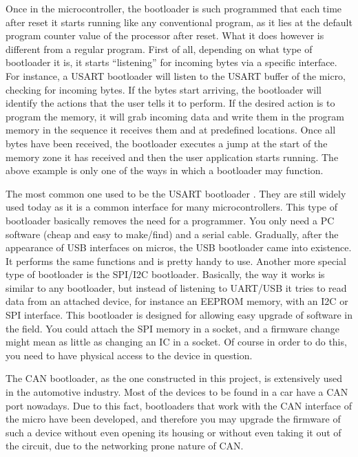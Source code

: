 \documentclass[11pt]{article} %
\begin{document}
Once in the microcontroller, the bootloader is such programmed that each time after reset it starts running like any conventional program, as it lies at the default program counter value of the processor after reset. What it does however is different from a regular program. First of all, depending on what type of bootloader it is, it starts “listening” for incoming bytes via a specific interface. For instance, a USART bootloader will listen to the USART buffer of the micro, checking for incoming bytes. If the bytes start arriving, the bootloader will identify the actions that the user tells it to perform. If the desired action is to program the memory, it will grab incoming data and write them in the program memory in the sequence it receives them and at predefined locations. Once all bytes have been received, the bootloader executes a jump at the start of the memory zone it has received and then the user application starts running. The above example is only one of the ways in which a bootloader may function. 

The most common one used to be the USART bootloader \cite{ref:bootloadertheory}. They are still widely used today as it is a common interface for many microcontrollers. This type of bootloader basically removes the need for a programmer. You only need a PC software (cheap and easy to make/find) and a serial cable. Gradually, after the appearance of USB interfaces on micros, the USB bootloader came into existence. It performs the same functions and is pretty handy to use.
Another more special type of bootloader is the SPI/I2C bootloader. Basically, the way it works is similar to any bootloader, but instead of listening to UART/USB it tries to read data from an attached device, for instance an EEPROM memory, with an I2C or SPI interface. This bootloader is designed for allowing easy upgrade of software in the field. You could attach the SPI memory in a socket, and a firmware change might mean as little as changing an IC in a socket. Of course in order to do this, you need to have physical access to the device in question.

The CAN bootloader, as the one constructed in this project, is extensively used in the automotive industry. Most of the devices to be found in a car have a CAN port nowadays. Due to this fact, bootloaders that work with the CAN interface of the micro have been developed, and therefore you may upgrade the firmware of such a device without even opening its housing or without even taking it out of the circuit, due to the networking prone nature of CAN.
\end{document}
